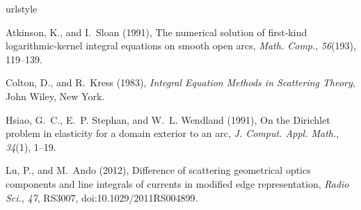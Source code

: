 \documentclass[draft,wrr]{AGUTeX}
\begin{document}
\begin{article}






\begin{thebibliography}{}

\providecommand{\natexlab}[1]{#1}
\expandafter\ifx\csname urlstyle\endcsname\relax
  \providecommand{\doi}[1]{doi:\discretionary{}{}{}#1}\else
  \providecommand{\doi}{doi:\discretionary{}{}{}\begingroup
  \urlstyle{rm}\Url}\fi

Atkinson, K., and I.~Sloan (1991), The numerical solution of first-kind
  logarithmic-kernel integral equations on smooth open arcs, \textit{Math.
  Comp.}, \textit{56}(193), 119--139.

Colton, D., and R.~Kress (1983), \textit{Integral Equation Methods in
  Scattering Theory}, John Wiley, New York.

Hsiao, G.~C., E.~P. Stephan, and W.~L. Wendland (1991), On the {D}irichlet
  problem in elasticity for a domain exterior to an arc, \textit{J. Comput.
  Appl. Math.}, \textit{34}(1), 1--19.

Lu, P., and M.~Ando (2012), Difference of scattering geometrical optics
  components and line integrals of currents in modified edge representation,
  \textit{Radio Sci.}, \textit{47},  RS3007, \doi{10.1029/2011RS004899}.

\end{thebibliography}




\end{article}
\end{document}
